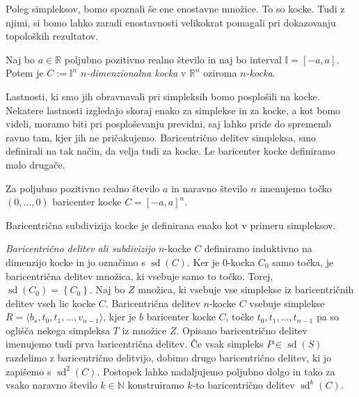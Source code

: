 \documentclass[mat1]{fmfdelo}
\newcommand{\R}{\mathbb R}
\newcommand{\N}{\mathbb N}
\DeclareMathOperator{\sd}{sd}
\newcommand{\I}{\mathbb I}
\newcommand{\0}{\underline{0}}
\begin{document}
Poleg simpleksov, bomo spoznali še ene enostavne množice. To so kocke. Tudi z njimi, si bomo lahko zaradi enostavnosti velikokrat pomagali pri dokazovanju topoloških rezultatov. 
\begin{definicija}
Naj bo $a \in \R$ poljubno pozitivno realno število in naj bo interval $\I = \left [ -a, a \right ] $. Potem je $C := \I^n$ \emph{$n$-dimenzionalna kocka} v $\R^n$ oziroma \emph{$n$-kocka}.
\end{definicija}
Lastnosti, ki smo jih obravnavali pri simpleksih bomo posplošili na kocke. Nekatere lastnosti izgledajo skoraj enako za simplekse in za kocke, a kot bomo videli, moramo biti pri posploševanju previdni, saj lahko pride do sprememb ravno tam, kjer jih ne pričakujemo.
Baricentrično delitev simpleksa, smo definirali na tak način, da velja tudi za kocke. Le baricenter kocke definiramo malo drugače.
\begin{definicija}
Za poljubno pozitivno realno število $a$ in naravno število $n$ imenujemo točko $(0, \dots, 0)$ baricenter kocke $C = \left [ -a, a \right ]^n$.
\end{definicija}
Baricentrična subdivizija kocke je definirana enako kot v primeru simpleksov.
\begin{definicija}
\emph{Baricentrično delitev ali subdivizijo} $n$-kocke $C$ definiramo induktivno na dimenzijo kocke in jo označimo s $\sd(C)$. Ker je $0$-kocka $C_0$ samo točka, je baricentrična delitev množica, ki vsebuje samo to točko. Torej, $\sd(C_0) = \left \{ C_0 \right \}$. Naj bo $Z$ množica, ki vsebuje vse simplekse iz baricentričnih delitev vseh lic kocke $C$.
Baricentrična delitev $n$-kocke $C$ vsebuje simplekse $R = \langle b_s , t_0, t_1, \dots, v_{n-1} \rangle$, kjer je $b$ baricenter kocke $C$, točke $t_0, t_1, \dots, t_{n-1}$ pa so oglišča nekega simpleksa $T$ iz množice $Z$. Opisano baricentrično delitev imenujemo tudi prva baricentrična delitev. Če vsak simpleks $P \in \sd(S)$ razdelimo z baricentrično delitvijo, dobimo drugo baricentrično delitev, ki jo zapišemo s $\sd^2(C)$. Postopek lahko nadaljujemo poljubno dolgo in tako za vsako naravno število $k \in \N$ konstruiramo $k$-to baricentrično delitev $\sd^k(C)$.
\end{definicija}
\end{document}
